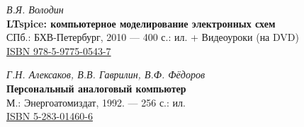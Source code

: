 \begin{thebibliography}{99}

\textit{В.Я. Володин}\\
\textbf{LTspice: компьютерное моделирование электронных схем}\\
СПб.: БХВ-Петербург, 2010 — 400 с.: ил. + Видеоуроки (на DVD)\\
\href{https://drive.google.com/file/d/1eikzy9VZjyYtTlxsEiXIxQdlqf8sWsft/view}{ISBN 978-5-9775-0543-7}


\textit{Г.Н. Алексаков, В.В. Гаврилин, В.Ф. Фёдоров}\\
\textbf{Персональный аналоговый компьютер}\\
М.: Энергоатомиздат, 1992. — 256 с.: ил.\\
\href{https://drive.google.com/file/d/1Y2qDinL2gvxxWUv8BajKqVWsxqI4dZXu/view}{ISBN 5-283-01460-6}


\end{thebibliography}
